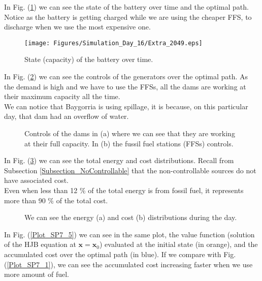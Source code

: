 In Fig. (\ref{Plot_SP7_2}) we can see the state of the battery over time and the optimal path. Notice as the battery is getting charged while we are using the cheaper FFS, to discharge when we use the most expensive one.

\begin{figure}[H]
\centering
\texttt{[image: Figures/Simulation\_Day\_16/Extra\_2049.eps]}
\caption{State (capacity) of the battery over time.}
\label{Plot_SP7_2}
\end{figure}

In Fig. (\ref{Plot_SP7_3}) we can see the controls of the generators over the optimal path. As the demand is high and we have to use the FFSs, all the dams are working at their maximum capacity all the time.\\
We can notice that Baygorria is using spillage, it is because, on this particular day, that dam had an overflow of water.

\begin{figure}[H]
\centering
{}\qquad
{}
\caption{Controls of the dams in (a) where we can see that they are working at their full capacity. In (b) the fussil fuel stations (FFSs) controls.}
\label{Plot_SP7_3}
\end{figure}

In Fig. (\ref{Plot_SP7_4}) we can see the total energy and cost distributions. Recall from Subsection \ref{Subsection_NoControllable} that the non-controllable sources do not have associated cost.\\
Even when less than 12 \% of the total energy is from fossil fuel, it represents more than 90 \% of the total cost.

\begin{figure}[H]
\centering
{}\qquad
{}
\caption{We can see the energy (a) and cost (b) distributions during the day.}
\label{Plot_SP7_4}
\end{figure}

In Fig. (\ref{Plot_SP7_5}) we can see in the same plot, the value function (solution of the HJB equation at $\bm{x}=\bm{x}_0$) evaluated at the initial state (in orange), and the accumulated cost over the optimal path (in blue). If we compare with Fig. (\ref{Plot_SP7_1}), we can see the accumulated cost increasing faster when we use more amount of fuel.

